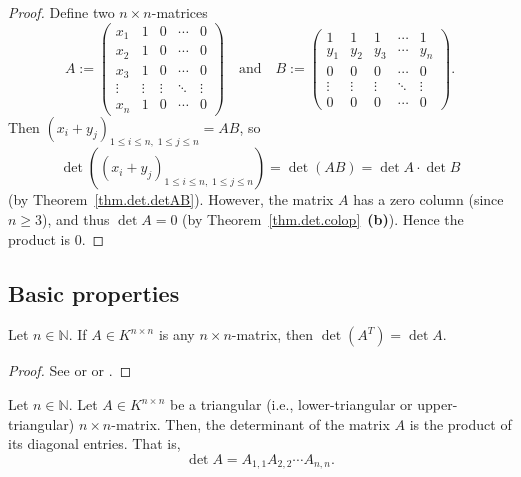 \begin{proof}
\leanok
Define two $n \times n$-matrices
\[
  A := \begin{pmatrix}
    x_1 & 1 & 0 & \cdots & 0 \\
    x_2 & 1 & 0 & \cdots & 0 \\
    x_3 & 1 & 0 & \cdots & 0 \\
    \vdots & \vdots & \vdots & \ddots & \vdots \\
    x_n & 1 & 0 & \cdots & 0
  \end{pmatrix}
  \quad \text{and} \quad
  B := \begin{pmatrix}
    1 & 1 & 1 & \cdots & 1 \\
    y_1 & y_2 & y_3 & \cdots & y_n \\
    0 & 0 & 0 & \cdots & 0 \\
    \vdots & \vdots & \vdots & \ddots & \vdots \\
    0 & 0 & 0 & \cdots & 0
  \end{pmatrix}.
\]
Then $\left( x_i + y_j \right)_{1 \leq i \leq n,\; 1 \leq j \leq n} = AB$, so
\[
  \det\left( \left( x_i + y_j \right)_{1 \leq i \leq n,\; 1 \leq j \leq n} \right)
  = \det(AB) = \det A \cdot \det B
\]
(by Theorem~\ref{thm.det.detAB}).
However, the matrix $A$ has a zero column
(since $n \geq 3$), and thus $\det A = 0$
(by Theorem~\ref{thm.det.colop}~\textbf{(b)}).
Hence the product is $0$.
\end{proof}

\subsection{Basic properties}

\begin{theorem}
\label{thm.det.transp}
\leantarget
\leanok
Let $n \in \mathbb{N}$. If $A \in K^{n \times n}$ is any $n \times n$-matrix,
then $\det(A^T) = \det A$.
\end{theorem}

\begin{proof}
\leanok
See \cite[Corollary B.16]{Strick13} or \cite[Exercise 6.4]{detnotes} or
\cite[\S 5.3.2]{Laue-det}.
\end{proof}

\begin{theorem}
\label{thm.det.triang}
\leantarget
\leanok
Let $n \in \mathbb{N}$. Let $A \in K^{n \times n}$ be a triangular (i.e.,
lower-triangular or upper-triangular) $n \times n$-matrix. Then, the
determinant of the matrix $A$ is the product of its diagonal entries. That is,
\[
  \det A = A_{1,1} A_{2,2} \cdots A_{n,n}.
\]
\end{theorem}

